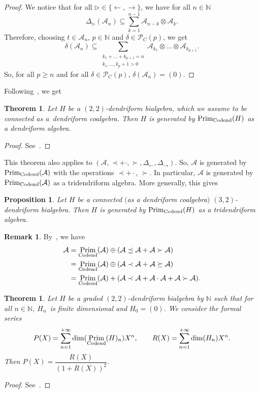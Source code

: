 \documentclass[pdftex]{sigma}
\numberwithin{equation}{section}
\theoremstyle{definition}
\newtheorem{Rq}[defi]{Remark}
\theoremstyle{plain}
\newtheorem{Prop}[defi]{Proposition}
\newtheorem{thm}[defi]{Theorem}
\newcommand{\N}{\mathbb{N}}
\DeclareMathOperator{\Prim}{Prim}
\begin{document}
\begin{proof}
	We notice that for all $\triangleright\in\{ \leftarrow,\rightarrow \}$, we have for all $n\in\N$
	\[
	\Delta_{\triangleright}(\mathcal{A}_n)\subseteq\sum_{k=1}^{n-1} \mathcal{A}_{n-k}\otimes \mathcal{A}_k.
	\]
	Therefore, choosing $t\in \mathcal{A}_n$, $p\in\N$ and $\delta\in\mathcal{P}_C(p)$, we get
	\[
	\delta(\mathcal{A}_n)\subseteq \sum_{\substack{k_1+\dots+k_{p+1}=n \\ k_1,\dots,k_{p}+1>0}} \mathcal{A}_{k_1}\otimes\dots\otimes \mathcal{A}_{k_{p+1}}.
	\]
	So, for all $p\geq n$ and for all $\delta\in\mathcal{P}_C(p)$, $\delta(\mathcal{A}_n)=(0).$
\end{proof}

Following~\cite{bidend}, we get

\begin{thm}
	Let $H$ be a $(2,2)$-dendriform bialgebra, which we assume to be connected as a~dendriform coalgebra. Then $H$ is generated by $\Prim_{\rm Codend}(H)$ as a dendriform algebra.
\end{thm}
\begin{proof}
	See~\cite[Theorem~21]{bidend}.
\end{proof}

This theorem also applies to $(\mathcal{A},\prec+\cdot, \succ,\Delta_{\leftarrow},\Delta_{\rightarrow})$.
So, $\mathcal{A}$ is generated by $\Prim_{\rm Codend}(\mathcal{A})$ with the operations $\prec+\cdot$, $\succ$.
In particular, $\mathcal{A}$ is generated by $\Prim_{\rm Codend}(\mathcal{A})$ as a tridendriform algebra. More generally, this gives

\begin{Prop}
	Let $H$ be a connected $($as a dendriform coalgebra$)$ $(3,2)$-dendriform bialgebra. Then $H$ is generated by $\Prim_{\rm Codend}(H)$ as a tridendriform algebra.
\end{Prop}
\begin{Rq}
	By~\cite{bidend}, we have
	\begin{align*}
		\mathcal{A}&=\Prim_{\rm Codend}(\mathcal{A})\oplus (\mathcal{A}\preceq \mathcal{A}+\mathcal{A}\succ\mathcal{A} ) \\
		&=\Prim_{\rm Codend}(\mathcal{A})\oplus (\mathcal{A}\prec \mathcal{A}+\mathcal{A}\succeq\mathcal{A} ) \\
		&=\Prim_{\rm Codend}(\mathcal{A})+ (\mathcal{A}\prec \mathcal{A}+\mathcal{A}\cdot \mathcal{A}+\mathcal{A}\succ\mathcal{A} ).
	\end{align*}
\end{Rq}
\begin{thm}	\label{thmcodend}
	Let $H$ be a graded $(2,2)$-dendriform bialgebra by $\N$ such that for all $n\in\N$, $H_n$~is finite dimensional and $H_0=(0)$. We consider the formal series
	\begin{gather*}
		P(X)=\sum_{n=1}^{+\infty}\dim(\Prim_{\rm Codend}(H)_n)X^n, \qquad R(X)=\sum_{n=1}^{+\infty}\dim(H_n)X^n.
	\end{gather*}
	Then $P(X)=\dfrac{R(X)}{(1+R(X))^2}$.
\end{thm}
\begin{proof}
	See~\cite[Corollary 37]{bidend}.
\end{proof}
\end{document}
